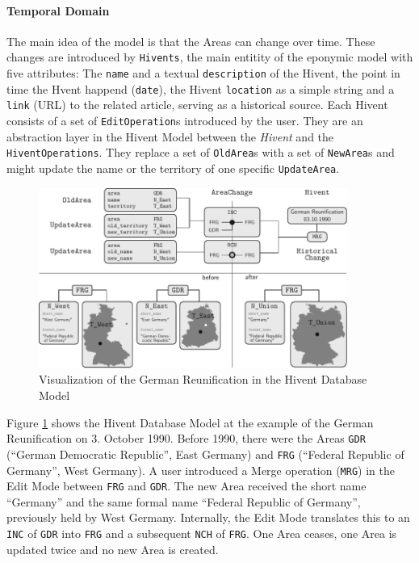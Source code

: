 
\paragraph{Temporal Domain} %
\label{par:temporal_domain}

The main idea of the model is that the Areas can change over time. These changes are introduced by \texttt{Hivents}, the main entitity of the eponymic model with five attributes: The \texttt{name} and a textual \texttt{description} of the Hivent, the point in time the Hvent happend (\texttt{date}), the Hivent \texttt{location} as a simple string and a \texttt{link} (URL) to the related article, serving as a historical source.
Each Hivent consists of a set of \texttt{EditOperation}s introduced by the user.
They are an abstraction layer in the Hivent Model between the \emph{Hivent} and the \texttt{HiventOperations}. They replace a set of \texttt{OldArea}s with a set of \texttt{NewArea}s and might update the name or the territory of one specific \texttt{UpdateArea}.



\begin{figure}[ht]
  \vspace{1.5em}
  \includegraphics[width=0.9\textwidth]{graphics/development/application/example_reunification}
  \caption{Visualization of the German Reunification in the Hivent Database Model}
  \label{fig:database_example_reunification}
\end{figure}

\newpage
Figure \ref{fig:database_example_reunification} shows the Hivent Database Model at the example of the German Reunification on 3. October 1990. Before 1990, there were the Areas \texttt{GDR} (``German Democratic Republic'', East Germany) and \texttt{FRG} (``Federal Republic of Germany'', West Germany). A user introduced a Merge operation (\texttt{MRG}) in the Edit Mode between \texttt{FRG} and \texttt{GDR}. The new Area received the short name ``Germany'' and the same formal name ``Federal Republic of Germany'', previously held by West Germany. Internally, the Edit Mode translates this to an \texttt{INC} of \texttt{GDR} into \texttt{FRG} and a subsequent \texttt{NCH} of \texttt{FRG}. One Area ceases, one Area is updated twice and no new Area is created.

